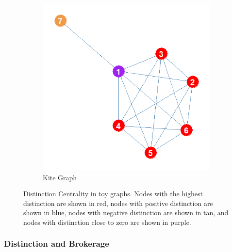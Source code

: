 \documentclass[12pt]{article}
\begin{document}
\begin{figure}
    \captionsetup[subfigure]{font=footnotesize,labelfont=footnotesize}
    \centering
    \begin{subfigure}[b]{0.3\textwidth}
        \includegraphics[width=1.0\textwidth]{Plots/Toys/kite.png}
            \caption{Kite Graph}
            \label{fig:kite}
    \end{subfigure}
    \caption{Distinction Centrality in toy graphs. Nodes with the highest distinction are shown in red, nodes with positive distinction are shown in blue, nodes with negative distinction are shown in tan, and nodes with distinction close to zero are shown in purple.}
    \label{fig:toys}
\end{figure}

\subsubsection{Distinction and Brokerage}

\end{document}
